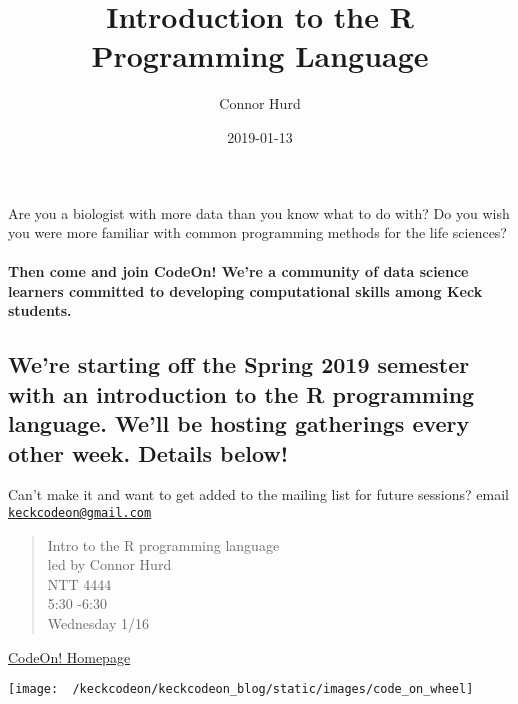 \documentclass[]{article}
\title{Introduction to the R Programming Language}
\author{Connor Hurd}
\date{2019-01-13}
\let\oldparagraph\paragraph
\renewcommand{\paragraph}[1]{\oldparagraph{#1}\mbox{}}
\begin{document}
\maketitle

Are you a biologist with more data than you know what to do with? Do you
wish you were more familiar with common programming methods for the life
sciences?

\hypertarget{then-come-and-join-codeon-were-a-community-of-data-science-learners-committed-to-developing-computational-skills-among-keck-students.}{%
\paragraph{Then come and join CodeOn! We're a community of data science
learners committed to developing computational skills among Keck
students.}\label{then-come-and-join-codeon-were-a-community-of-data-science-learners-committed-to-developing-computational-skills-among-keck-students.}}

\hypertarget{were-starting-off-the-spring-2019-semester-with-an-introduction-to-the-r-programming-language.-well-be-hosting-gatherings-every-other-week.-details-below}{%
\subsection{We're starting off the Spring 2019 semester with an
introduction to the R programming language. We'll be hosting gatherings
every other week. Details
below!}\label{were-starting-off-the-spring-2019-semester-with-an-introduction-to-the-r-programming-language.-well-be-hosting-gatherings-every-other-week.-details-below}}

Can't make it and want to get added to the mailing list for future
sessions? email
\href{mailto:keckcodeon@gmail.com}{\nolinkurl{keckcodeon@gmail.com}}

\begin{quote}
Intro to the R programming language\\
led by Connor Hurd\\
NTT 4444\\
5:30 -6:30\\
Wednesday 1/16
\end{quote}

\href{https://keckcodeon.netlify.com}{CodeOn! Homepage}

\begin{center}\texttt{[image: ~/keckcodeon/keckcodeon\_blog/static/images/code\_on\_wheel]} \end{center}
\end{document}

